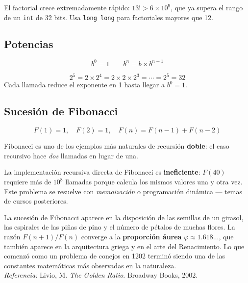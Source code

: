 \documentclass[12pt, oneside]{article}
\begin{document}
\begin{consejo}
  El factorial crece extremadamente rápido: $13! > 6 \times 10^9$, que ya
  supera el rango de un \texttt{int} de 32 bits.  Usa \texttt{long long}
  para factoriales mayores que 12.
\end{consejo}

\subsection{Potencias}

\[
  b^0 = 1 \qquad b^n = b \times b^{n-1}
\]

\begin{ejemplo}
\[
  2^5 = 2 \times 2^4 = 2 \times 2 \times 2^3 = \cdots = 2^5 = 32
\]
Cada llamada reduce el exponente en 1 hasta llegar a $b^0 = 1$.
\end{ejemplo}

\subsection{Sucesión de Fibonacci}

\[
  F(1) = 1, \quad F(2) = 1, \quad F(n) = F(n-1) + F(n-2)
\]

Fibonacci es uno de los ejemplos más naturales de recursión \textbf{doble}:
el caso recursivo hace \textit{dos} llamadas en lugar de una.

\begin{advertencia}
  La implementación recursiva directa de Fibonacci es \textbf{ineficiente}:
  $F(40)$ requiere más de $10^8$ llamadas porque calcula los mismos valores
  una y otra vez.  Este problema se resuelve con \textit{memoización} o
  programación dinámica — temas de cursos posteriores.
\end{advertencia}

\begin{tecnico}
  La sucesión de Fibonacci aparece en la disposición de las semillas de
  un girasol, las espirales de las piñas de pino y el número de pétalos de
  muchas flores.  La razón $F(n+1)/F(n)$ converge a la \textbf{proporción
  áurea} $\varphi \approx 1.618\ldots$, que también aparece en la
  arquitectura griega y en el arte del Renacimiento.  Lo que comenzó como
  un problema de conejos en 1202 terminó siendo una de las constantes
  matemáticas más observadas en la naturaleza.\\
  \textit{Referencia:} Livio, M. \textit{The Golden Ratio}.
  Broadway Books, 2002.
\end{tecnico}
\end{document}
